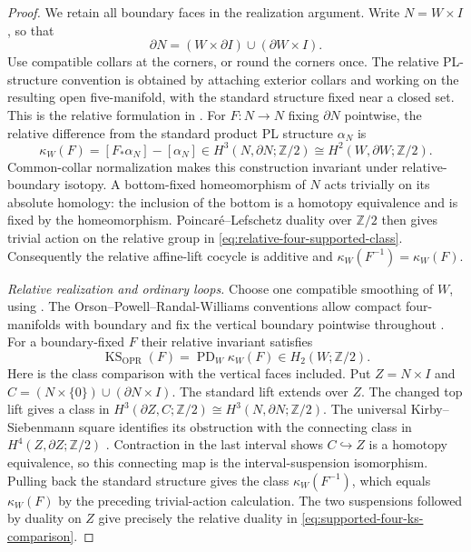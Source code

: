 \begin{proof}
We retain all boundary faces in the realization argument.
Write $N=W\times I$, so that
\[
 \partial N=(W\times\partial I)\cup(\partial W\times I).
\]
Use compatible collars at the corners, or round the corners once.
The relative PL-structure convention is obtained by attaching
exterior collars and working on the resulting open
five-manifold, with the standard structure fixed near a closed
set. This is the relative formulation in
\cite[Essay~V, Section~3, equation~(3.2), p.~240]{KirbySiebenmann1977}.
For $F:N\to N$ fixing $\partial N$ pointwise, the relative
difference from the standard product PL structure $\alpha_N$ is
\begin{equation}\label{eq:relative-four-supported-class}
 \kappa_W(F)=[F_*\alpha_N]-[\alpha_N]
 \in H^3(N,\partial N;\mathbb Z/2)
       \cong H^2(W,\partial W;\mathbb Z/2).
\end{equation}
Common-collar normalization makes this construction invariant
under relative-boundary isotopy. A bottom-fixed homeomorphism
of $N$ acts trivially on its absolute homology: the inclusion
of the bottom is a homotopy equivalence and is fixed by the
homeomorphism. Poincar\'e--Lefschetz duality over $\mathbb Z/2$
then gives trivial action on the relative group in
\eqref{eq:relative-four-supported-class}. Consequently the
relative affine-lift cocycle is additive and
$\kappa_W(F^{-1})=\kappa_W(F)$.

\emph{Relative realization and ordinary loops.}
Choose one compatible smoothing of $W$, using
\cite[Essay~I, p.~39]{KirbySiebenmann1977}.
The Orson--Powell--Randal-Williams conventions allow compact
four-manifolds with boundary and fix the vertical boundary
pointwise throughout
\cite[Section~1.1, p.~1; Sections~2.1--2.2, pp.~4--5]
{OrsonPowellRandalWilliams2026}.
For a boundary-fixed $F$ their relative invariant satisfies
\begin{equation}\label{eq:supported-four-ks-comparison}
 \operatorname{KS}_{\mathrm{OPR}}(F)
             =\operatorname{PD}_W\kappa_W(F)
                         \in H_2(W;\mathbb Z/2).
\end{equation}
Here is the class comparison with the vertical faces included.
Put $Z=N\times I$ and
$C=(N\times\{0\})\cup(\partial N\times I)$.
The standard lift extends over $Z$. The changed top lift gives
a class in
$H^3(\partial Z,C;\mathbb Z/2)\cong H^3(N,\partial N;\mathbb Z/2)$.
The universal Kirby--Siebenmann square identifies its obstruction
with the connecting class in $H^4(Z,\partial Z;\mathbb Z/2)$
\cite[Essay~V, Section~5.6, pp.~252--253]{KirbySiebenmann1977}.
Contraction in the last interval shows $C\hookrightarrow Z$
is a homotopy equivalence, so this connecting map is the
interval-suspension isomorphism. Pulling back the standard
structure gives the class $\kappa_W(F^{-1})$, which equals
$\kappa_W(F)$ by the preceding trivial-action calculation.
The two suspensions followed by duality on $Z$ give precisely
the relative duality in \eqref{eq:supported-four-ks-comparison}.


\end{proof}
